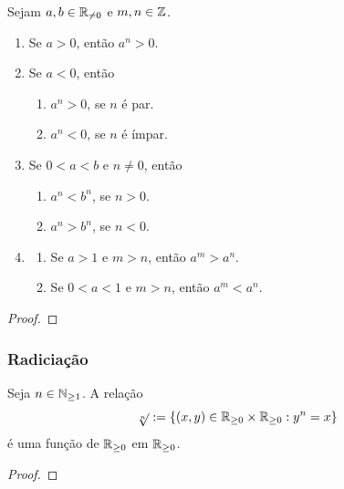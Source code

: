 \begin{corollary}
    Sejam $a,b \in \mathbb{R}_{\neq 0}$ e $m,n \in \mathbb{Z}$.
        \begin{enumerate}[leftmargin=*, align=left, label=\textbf{(\alph*)}]
            \item Se $a > 0$, então $a^n > 0$.
            \item Se $a < 0$, então
                \begin{enumerate}[label=\roman*.]
                    \item $a^n > 0$, se $n$ é par.
                    \item $a^n < 0$, se $n$ é ímpar.
                \end{enumerate}
            \item Se $0 < a < b$ e $n \neq 0$, então
                \begin{enumerate}[label=\roman*.]
                    \item $a^n < b^n$, se $n > 0$.
                    \item $a^n > b^n$, se $n < 0$.
                \end{enumerate}
            \item
                \begin{enumerate}[label=\roman*.]
                    \item Se $a > 1$ e $m>n$, então $a^m > a^n$.
                    \item Se $0 < a < 1$ e $m>n$, então $a^m < a^n$.
                \end{enumerate}
        \end{enumerate}
\end{corollary}

\begin{proof}
    \blackproof
\end{proof}

\subsubsection{Radiciação}

\begin{theorem}
    Seja $n \in \mathbb{N}_{\geq 1}$. A relação
        \[
            \sqrt[n]{} := \{(x,y) \in \mathbb{R}_{\geq 0} \times \mathbb{R}_{\geq 0} : y^n = x \}
        \]
    é uma função de $\mathbb{R}_{\geq 0}$ em $\mathbb{R}_{\geq 0}$.
\end{theorem}

\begin{proof}
    \blackproof
\end{proof}

